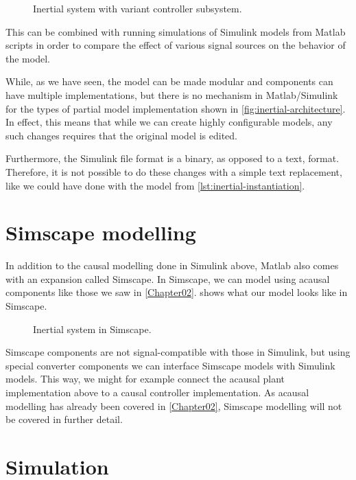 \documentclass[\rootfolder/main.tex]{subfiles}
\begin{document}
\begin{figure}[ht]
    \caption{Inertial system with variant controller subsystem.\label{fig:inertial-simscape-blowup}}
\end{figure}

This can be combined with running simulations of Simulink models from Matlab scripts in order to compare the effect of various signal sources on the behavior of the model.

While, as we have seen, the model can be made modular and components can have multiple implementations, but there is no mechanism in Matlab/Simulink for
the types of partial model implementation shown in \cref{fig:inertial-architecture}.
In effect, this means that while we can create highly configurable models, any such changes requires that the original model is edited.

Furthermore, the Simulink file format is a binary, as opposed to a text, format.
Therefore, it is not possible to do these changes with a simple text replacement, like we could have done with the model from \cref{lst:inertial-instantiation}.

\section{Simscape modelling}

In addition to the causal modelling done in Simulink above, Matlab also comes with an expansion called Simscape.
In Simscape, we can model using acausal components like those we saw in \cref{Chapter02}.
 shows what our model looks like in Simscape.

\begin{figure}[ht]
    \caption{Inertial system in Simscape.\label{fig:inertial-simscape}}
\end{figure}

Simscape components are not signal-compatible with those in Simulink, but using special converter components we can interface Simscape models with Simulink models.
This way, we might for example connect the acausal plant implementation above to a causal controller implementation.
As acausal modelling has already been covered in \cref{Chapter02}, Simscape modelling will not be covered in further detail.

\section{Simulation}
\end{document}

